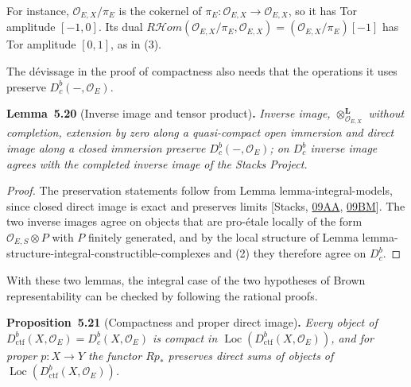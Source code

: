 \documentclass[11pt]{article}
\newenvironment{bpstatement}[2]{\par\addvspace{0.6\baselineskip}\noindent\textbf{#1}#2\textbf{.}\enspace\ignorespaces}
  {\par\addvspace{0.4\baselineskip}}
\newenvironment{bpstatementit}[2]{\begin{bpstatement}{#1}{#2}\itshape\ignorespaces}{\end{bpstatement}}
\providecommand{\Dbc}{}\renewcommand{\Dbc}{D^b_c}
\providecommand{\Loc}{}\renewcommand{\Loc}{\operatorname{Loc}}
\providecommand{\cHom}{}\renewcommand{\cHom}{R\mathcal{H}\!om}
\begin{document}
\label{bp473}%
For instance, \(\mathcal O_{E,X}/\pi_E\) is the cokernel of \(\pi_E:\mathcal O_{E,X}\to\mathcal O_{E,X}\), so it has Tor amplitude \([-1,0]\). Its dual \(\cHom(\mathcal O_{E,X}/\pi_E,\mathcal O_{E,X})=
(\mathcal O_{E,X}/\pi_E)[-1]\) has Tor amplitude \([0,1]\), as in (3).

The dévissage in the proof of compactness also needs that the operations it uses preserve \(\Dbc(-,\mathcal O_E)\).

\label{bp474}%
\begin{bpstatementit}{Lemma~5.20}{ (Inverse image and tensor product)}
Inverse image, \(\otimes^{\mathbf L}_{\mathcal O_{E,X}}\) without completion, extension by zero along a quasi-compact open immersion and direct image along a closed immersion preserve \(\Dbc(-,\mathcal O_E)\); on \(\Dbc\) inverse image agrees with the completed inverse image of the Stacks Project.
\end{bpstatementit}

\begin{proof}[{Proof}]\label{bp475}%
The preservation statements follow from Lemma lemma-integral-models, since closed direct image is exact and preserves limits [Stacks, \href{https://stacks.math.columbia.edu/tag/09AA}{09AA}, \href{https://stacks.math.columbia.edu/tag/09BM}{09BM}]. The two inverse images agree on objects that are pro-étale locally of the form \(\mathcal O_{E,S}\otimes P\) with \(P\) finitely generated, and by the local structure of Lemma lemma-structure-integral-constructible-complexes and (2) they therefore agree on \(\Dbc\).
\end{proof}

\label{bp476}%
With these two lemmas, the integral case of the two hypotheses of Brown representability can be checked by following the rational proofs.

\label{bp477}%
\begin{bpstatementit}{Proposition~5.21}{ (Compactness and proper direct image)}
Every object of \(D^b_{\mathrm{ctf}}(X,\mathcal O_E)=\Dbc(X,\mathcal O_E)\) is compact in \(\Loc(D^b_{\mathrm{ctf}}(X,\mathcal O_E))\), and for proper \(p:X\to Y\) the functor \(Rp_*\) preserves direct sums of objects of \(\Loc(D^b_{\mathrm{ctf}}(X,\mathcal O_E))\).
\end{bpstatementit}
\end{document}
